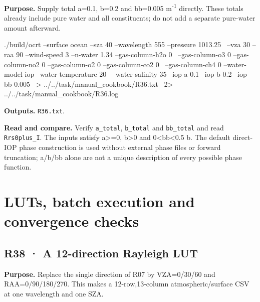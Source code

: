 \label{recipe:R36}

\textbf{Purpose. }Supply total a=0.1, b=0.2 and bb=0.005 m\textsuperscript{-1} directly. These totals already include pure water and all constituents; do not add a separate pure-water amount afterward.

\noindent\begin{minipage}{\linewidth}
\begin{ManualCode}

./build/ocrt --surface ocean --sza 40 --wavelength 555 --pressure 1013.25 \
  --vza 30 --raa 90 --wind-speed 3 --n-water 1.34 --gas-column-h2o 0 \
  --gas-column-o3 0 --gas-column-no2 0 --gas-column-o2 0 --gas-column-co2 0 \
  --gas-column-ch4 0 --water-model iop --water-temperature 20 \
  --water-salinity 35 --iop-a 0.1 --iop-b 0.2 --iop-bb 0.005 \
  > ../../task/manual_cookbook/R36.txt \
  2> ../../task/manual_cookbook/R36.log

\end{ManualCode}
\end{minipage}\par

\textbf{Outputs. }\texttt{R36.txt}.

\textbf{Read and compare. }Verify \texttt{a\_\allowbreak{}total}, \texttt{b\_\allowbreak{}total} and \texttt{bb\_\allowbreak{}total} and read \texttt{Rrs0plus\_\allowbreak{}I}. The inputs satisfy a>=0, b>0 and 0<bb<0.5 b. The default direct-IOP phase construction is used without external phase files or forward truncation; a/b/bb alone are not a unique description of every possible phase function.

\clearpage

\section{LUTs, batch execution and convergence checks}

\label{sec:auto:09_cookbook:6}

\label{sec:cookbook_group:workflow}

\subsection{R38 · A 12-direction Rayleigh LUT}
\label{sec:auto:09_cookbook:6.1}

\label{recipe:R38}

\textbf{Purpose. }Replace the single direction of R07 by VZA=0/30/60\textdegree{} and RAA=0/90/180/270\textdegree{}. This makes a 12-row,13-column atmospheric/surface CSV at one wavelength and one SZA.

